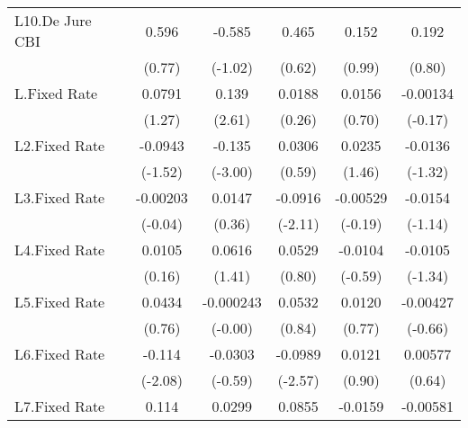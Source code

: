 \begin{table}[htbp]
\begin{tabular}{l*{5}{c}}
L10.De Jure CBI                         &    0.596         &   -0.585         &    0.465         &    0.152         &    0.192         \\
                                        &   (0.77)         &  (-1.02)         &   (0.62)         &   (0.99)         &   (0.80)         \\
\addlinespace
L.Fixed Rate                            &   0.0791         &    0.139\sym{*}  &   0.0188         &   0.0156         & -0.00134         \\
                                        &   (1.27)         &   (2.61)         &   (0.26)         &   (0.70)         &  (-0.17)         \\
\addlinespace
L2.Fixed Rate                           &  -0.0943         &   -0.135\sym{**} &   0.0306         &   0.0235         &  -0.0136         \\
                                        &  (-1.52)         &  (-3.00)         &   (0.59)         &   (1.46)         &  (-1.32)         \\
\addlinespace
L3.Fixed Rate                           & -0.00203         &   0.0147         &  -0.0916\sym{*}  & -0.00529         &  -0.0154         \\
                                        &  (-0.04)         &   (0.36)         &  (-2.11)         &  (-0.19)         &  (-1.14)         \\
\addlinespace
L4.Fixed Rate                           &   0.0105         &   0.0616         &   0.0529         &  -0.0104         &  -0.0105         \\
                                        &   (0.16)         &   (1.41)         &   (0.80)         &  (-0.59)         &  (-1.34)         \\
\addlinespace
L5.Fixed Rate                           &   0.0434         &-0.000243         &   0.0532         &   0.0120         & -0.00427         \\
                                        &   (0.76)         &  (-0.00)         &   (0.84)         &   (0.77)         &  (-0.66)         \\
\addlinespace
L6.Fixed Rate                           &   -0.114\sym{*}  &  -0.0303         &  -0.0989\sym{*}  &   0.0121         &  0.00577         \\
                                        &  (-2.08)         &  (-0.59)         &  (-2.57)         &   (0.90)         &   (0.64)         \\
\addlinespace
L7.Fixed Rate                           &    0.114\sym{*}  &   0.0299         &   0.0855         &  -0.0159         & -0.00581         \\

\end{tabular}
\end{table}
